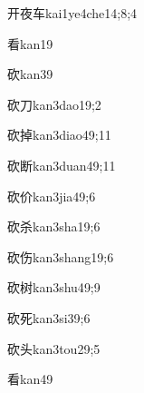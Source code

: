 \begin{verbete}{开夜车}{kai1ye4che1}{4;8;4}
\end{verbete}

\begin{verbete}{看}{kan1}{9}
\end{verbete}

\begin{verbete}{砍}{kan3}{9}
\end{verbete}

\begin{verbete}{砍刀}{kan3dao1}{9;2}
\end{verbete}

\begin{verbete}{砍掉}{kan3diao4}{9;11}
\end{verbete}

\begin{verbete}{砍断}{kan3duan4}{9;11}
\end{verbete}

\begin{verbete}{砍价}{kan3jia4}{9;6}
\end{verbete}

\begin{verbete}{砍杀}{kan3sha1}{9;6}
\end{verbete}

\begin{verbete}{砍伤}{kan3shang1}{9;6}
\end{verbete}

\begin{verbete}{砍树}{kan3shu4}{9;9}
\end{verbete}

\begin{verbete}{砍死}{kan3si3}{9;6}
\end{verbete}

\begin{verbete}{砍头}{kan3tou2}{9;5}
\end{verbete}

\begin{verbete}{看}{kan4}{9}
\end{verbete}

